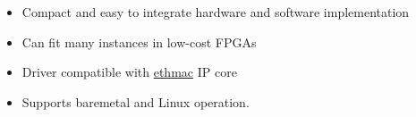 \begin{itemize}
  \itemsep-0.5em
\item Compact and easy to integrate hardware and software implementation
\item Can fit many instances in low-cost FPGAs
\item Driver compatible with \href{https://opencores.org/projects/ethmac}{ethmac} IP core
\item Supports baremetal and Linux operation.
\end{itemize}
